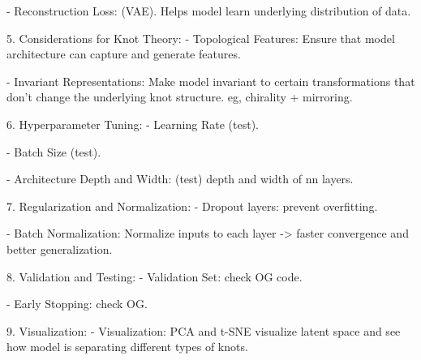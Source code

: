    - Reconstruction Loss: (VAE). Helps model learn underlying distribution of data.

    5. Considerations for Knot Theory:
   - Topological Features: Ensure that model architecture can capture and generate features.

   - Invariant Representations: Make model invariant to certain transformations that don't change the underlying knot structure. eg, chirality + mirroring.

    6. Hyperparameter Tuning:
   - Learning Rate (test).

   - Batch Size (test).

   - Architecture Depth and Width: (test) depth and width of nn layers.

    7. Regularization and Normalization:
   - Dropout layers: prevent overfitting.

   - Batch Normalization: Normalize inputs to each layer -> faster convergence and better generalization.

    8. Validation and Testing:
   - Validation Set: check OG code.

   - Early Stopping: check OG.

    9. Visualization:
   - Visualization: PCA and t-SNE visualize latent space and see how model is separating different types of knots.

